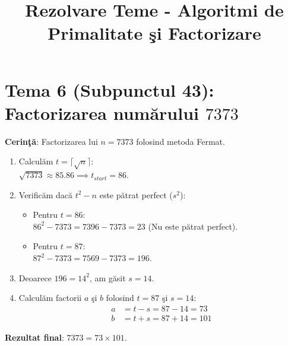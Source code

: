 \documentclass[12pt, a4paper]{article}
\title{Rezolvare Teme - Algoritmi de Primalitate \c{s}i Factorizare}
\author{}
\date{}
\begin{document}
\maketitle
\section*{Tema 6 (Subpunctul 43): Factorizarea num\u{a}rului $7373$}

\textbf{Cerin\c{t}\u{a}}: Factorizarea lui $n = 7373$ folosind metoda Fermat.

\begin{enumerate}
    \item Calcul\u{a}m $t = \lceil\sqrt{n}\rceil$: \\
    $\sqrt{7373} \approx 85.86 \implies t_{start} = 86$.
    \item Verific\u{a}m dac\u{a} $t^2 - n$ este p\u{a}trat perfect ($s^2$):
    \begin{itemize}
        \item Pentru $t = 86$: \\
        $86^2 - 7373 = 7396 - 7373 = 23$ (Nu este p\u{a}trat perfect).
        \item Pentru $t = 87$: \\
        $87^2 - 7373 = 7569 - 7373 = 196$.
    \end{itemize}
    \item Deoarece $196 = 14^2$, am g\u{a}sit $s = 14$.
    \item Calcul\u{a}m factorii $a$ \c{s}i $b$ folosind $t = 87$ \c{s}i $s = 14$:
    \begin{align*}
        a &= t - s = 87 - 14 = 73 \\
        b &= t + s = 87 + 14 = 101
    \end{align*}
    \end{enumerate}

\textbf{Rezultat final}: $7373 = 73 \times 101$.
\end{document}
